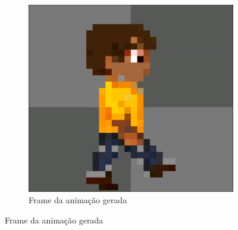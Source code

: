 \begin{figure}[htbp]
\begin{subfigure}{0.35\linewidth}
        \includegraphics[width=1\linewidth]{figs/pixelLab/dia3/print5.PNG}
        \caption{\small Frame da animação gerada}
        \label{fig:pixelLabAnimacao4b}
    \end{subfigure}
\end{figure}

